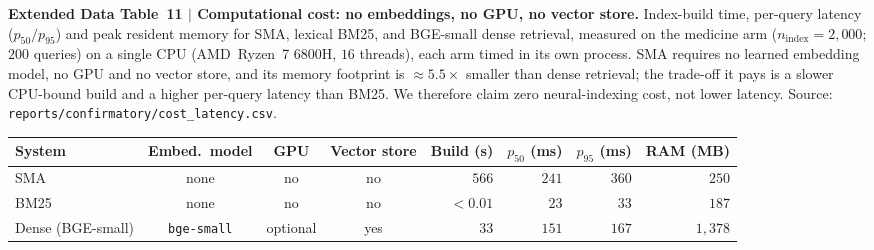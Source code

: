 \documentclass[pdflatex,sn-nature]{sn-jnl}
\newcommand{\edcaption}[1]{\par{\small #1}\par\smallskip}
\begin{document}
\begin{appendices}

\begin{table}[htbp]
\centering
\edcaption{\textbf{Extended Data Table~11 $|$ Computational cost: no embeddings, no
    GPU, no vector store.}
  Index-build time, per-query latency ($p_{50}/p_{95}$) and peak resident memory
  for SMA, lexical BM25, and BGE-small dense retrieval, measured on the medicine
  arm ($n_\text{index}{=}2{,}000$; $200$ queries) on a single CPU (AMD~Ryzen~7
  6800H, $16$ threads), each arm timed in its own process. SMA requires no learned
  embedding model, no GPU and no vector store, and its memory footprint is
  $\approx 5.5\times$ smaller than dense retrieval; the trade-off it pays is a
  slower CPU-bound build and a higher per-query latency than BM25. We therefore
  claim zero neural-indexing cost, not lower latency.
  Source: \texttt{reports/confirmatory/cost\_latency.csv}.}
\small
\setlength{\tabcolsep}{5pt}
\begin{adjustbox}{max width=\textwidth}
\begin{tabular}{lcccrrrr}
\toprule
\textbf{System} & \textbf{Embed.\ model} & \textbf{GPU} & \textbf{Vector store} &
    \textbf{Build (s)} & \textbf{$p_{50}$ (ms)} & \textbf{$p_{95}$ (ms)} &
    \textbf{RAM (MB)} \\
\midrule
\rowcolor{smarow}SMA              & none           & no       & no  & $566$    & $241$ & $360$ & $250$ \\
BM25                              & none           & no       & no  & $<\!0.01$ & $23$  & $33$  & $187$ \\
Dense (BGE-small)                 & \texttt{bge-small} & optional & yes & $33$     & $151$ & $167$ & $1{,}378$ \\
\bottomrule
\end{tabular}
\end{adjustbox}
\label{tab:ed11_cost}
\end{table}




\end{appendices}
\end{document}
